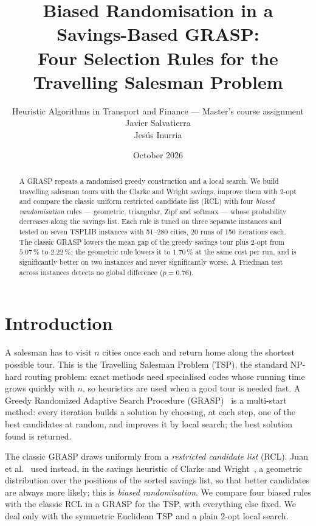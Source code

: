 \documentclass[10pt,a4paper]{article}
\title{\vspace{-1.2cm}\bfseries Biased Randomisation in a Savings-Based GRASP:\\
Four Selection Rules for the Travelling Salesman Problem}
\author{Heuristic Algorithms in Transport and Finance --- Master's course assignment \\
    Javier Salvatierra \\
    Jesús Inurria
}
\date{October 2026}
\begin{document}
\maketitle
\vspace{-0.8cm}

\begin{abstract}
\noindent\small
A GRASP repeats a randomised greedy construction and a local search. We build travelling salesman tours with the Clarke and Wright savings, improve
them with 2-opt and compare the classic uniform restricted candidate list (RCL) with four
\emph{biased randomisation} rules --- geometric, triangular, Zipf and softmax --- whose probability
decreases along the savings list. Each rule is tuned on three separate
instances and tested on seven TSPLIB instances with 51--280 cities, 20 runs of 150 iterations each.
The classic GRASP lowers the mean gap of the greedy savings tour plus 2-opt from $5.07\,\%$ to
$2.22\,\%$; the geometric rule lowers it to $1.70\,\%$ at the same cost per run, and is significantly
better on two instances and never significantly worse. A Friedman test across instances detects no global
difference ($p=0.76$).
\end{abstract}

\section{Introduction}

A salesman has to visit $n$ cities once each and return home along the shortest possible tour. This
is the Travelling Salesman Problem (TSP), the standard NP-hard routing problem: exact methods need specialised codes whose running time grows quickly
with $n$, so heuristics are used when a good tour is needed fast. A Greedy Randomized Adaptive Search Procedure (GRASP)~\cite{feo1995} is a multi-start method: every iteration builds a solution by choosing, at each step, one of the best candidates at random, and improves it by local search; the best solution found is returned.

The classic GRASP draws uniformly from a \emph{restricted candidate list} (RCL). Juan et
al.~\cite{juan2011} used instead, in the savings heuristic of Clarke and Wright~\cite{cw1964}, a
geometric distribution over the positions of the sorted savings list, so that better candidates
are always more likely; this is \emph{biased randomisation}. We compare four biased rules with the classic RCL in a GRASP for the TSP, with everything else fixed. We deal only with the symmetric Euclidean TSP and a plain 2-opt local search.
\end{document}
